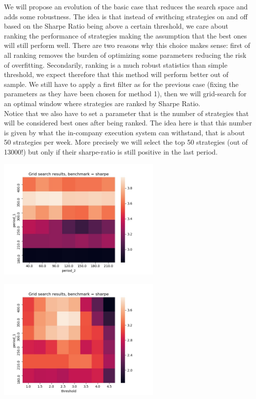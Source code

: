 We will propose an evolution of the basic case that reduces the search space and adds some robustness. The idea is that instead of swithcing strategies on and off based on the Sharpe Ratio being above a certain threshold, we care about ranking the performance of strategies making the assumption that the best ones will still perform well. There are two reasons why this choice makes sense: first of all ranking removes the burden of optimizing some parameters reducing the risk of overfitting. Secondarily, ranking is a much robust statistics than simple threshold, we expect therefore that this method will perform better out of sample. We still have to apply a first filter as for the previous case (fixing the parameters as they have been chosen for method 1), then we will grid-search for an optimal window where strategies are ranked by Sharpe Ratio.\\
Notice that we also have to set a parameter that is the number of strategies that will be considered best ones after being ranked. The idea here is that this number is given by what the in-company execution system can withstand, that is about 50 strategies per week. More precisely we will select the top 50 strategies (out of 13000!) but only if their sharpe-ratio is still positive in the last period.

\begin{center}
	\centering
    \includegraphics[width=0.6\textwidth]{GridSearches/Sharpe_Ranking/Figure_1.jpeg}
	\label{Sharpe_Ranking_1}
\end{center}

\begin{center}
	\centering
	\includegraphics[width=0.6\textwidth]{GridSearches/Sharpe_Ranking/Figure_2.jpeg}
	\label{Sharpe_Ranking_2}
\end{center}

